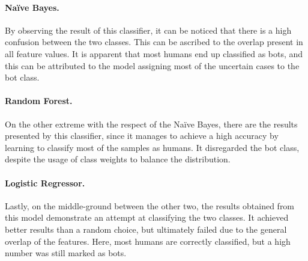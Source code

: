 \documentclass[12pt, a4paper]{article}
\begin{document}
    	\paragraph{Na\"ive Bayes.} By observing the result of this classifier, it can be noticed that there is a high confusion between the two classes. This can be ascribed to the overlap present in all feature values. 
    		It is apparent that most humans end up classified as bots, and this can be attributed to the model assigning most of the uncertain cases to the bot class.
    	\paragraph{Random Forest.} On the other extreme with the respect of the Na\"ive Bayes, there are the results presented by this classifier, since it manages to achieve a high accuracy by learning to classify most of the samples as humans. It disregarded the bot class, despite the usage of class weights to balance the distribution.
    	\paragraph{Logistic Regressor.} Lastly, on the middle-ground between the other two, the results obtained from this model demonstrate an attempt at classifying the two classes. It achieved better results than a random choice, but ultimately failed due to the general overlap of the features. Here, most humans are correctly classified, but a high number was still marked as bots.\\
    	
\end{document}
